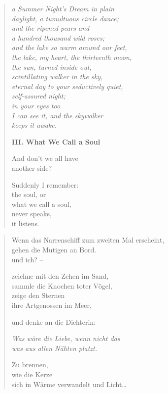 \clearpage

\begin{verse}
{\itshape
a {\upshape Summer Night's Dream} in plain\label{summer-nights}\\
daylight, a tumultuous circle dance;\\
and the ripened pears and\\
a hundred thousand wild roses;\\
and the lake so warm around our feet,\\
the lake, my heart, the thirteenth moon,\\
the sun, turned inside out,\\
scintillating walker in the sky,\\
eternal day to your seductively quiet,\\
self-assured night;\\
in your eyes too\\
I can see it, and the skywalker\\
keeps it awake.}

\vspace*{\onelineskip}
{\bfseries III. What We Call a Soul}

And don't we all have\\
another side?

Suddenly I remember:\\
the soul, or\\
what we call a soul,\\
never speaks,\\
it listens.
\end{verse}

\clearpage

\begin{verse}
Wenn das Narrenschiff zum zweiten Mal erscheint,\\
gehen die Mutigen an Bord.\\
und ich? --

zeichne mit den Zehen im Sand,\\
sammle die Knochen toter Vögel,\\
zeige den Sternen\\
ihre Artgenossen im Meer,

und denke an die Dichterin:

{\itshape Was wäre die Liebe, wenn nicht das\\
was aus allen Nähten platzt.}

Zu brennen,\\
wie die Kerze\\
sich in Wärme verwandelt und Licht\ldots
\end{verse}

